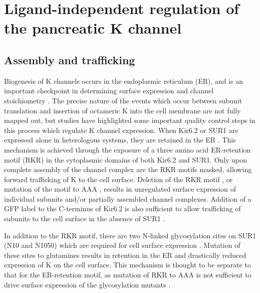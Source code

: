\section{Ligand-independent regulation of the pancreatic K\ATP{} channel}

\subsection{Assembly and trafficking}

Biogenesis of K\ATP{} channels occurs in the endoplasmic reticulum (ER), and is an important checkpoint in determining surface expression and channel stoichiometry \cite{zerangue_new_1999-1, martin_pharmacological_2013}.
The precise nature of the events which occur between subunit translation and insertion of octameric K\ATP{} into the cell membrane are not fully mapped out, but studies have highlighted some important quality control steps in this process which regulate K\ATP{} channel expression.
When Kir6.2 or SUR1 are expressed alone in heterologous systems, they are retained in the ER \cite{zerangue_new_1999-1}.
This mechanism is achieved through the exposure of a three amino acid ER-retention motif (RKR) in the cytoplasmic domains of both Kir6.2 and SUR1.
Only upon complete assembly of the channel complex are the RKR motifs masked, allowing forward trafficking of K\ATP{} to the cell surface.
Deletion of the RKR motif \cite{tucker_truncation_1997}, or mutation of the motif to AAA \cite{zerangue_new_1999-1}, results in unregulated surface expression of individual subunits and/or partially assembled channel complexes.
Addition of a GFP label to the C-terminus of Kir6.2 is also sufficient to allow trafficking of subunits to the cell surface in the absence of SUR1 \cite{john_sulphonylurea_1998-1}.

In addition to the RKR motif, there are two N-linked glycosylation sites on SUR1 (N10 and N1050) which are required for cell surface expression \cite{conti_membrane_2002}.
Mutation of these sites to glutamines results in retention in the ER and drastically reduced expression of K\ATP{} on the cell surface.
This mechanism is thought to be separate to that for the ER-retention motif, as mutation of RKR to AAA is not sufficient to drive surface expression of the glycosylation mutants \cite{conti_membrane_2002}.

